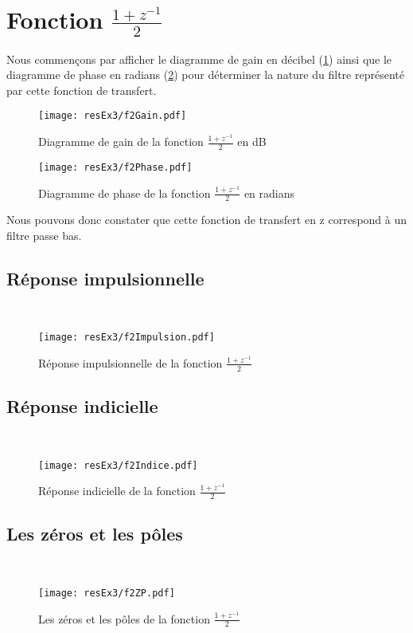 \section{Fonction $\frac{1+z^{-1}}{2}$}
Nous commençons par afficher le diagramme de gain en décibel (\ref{f2 Diagramme de gain}) ainsi que le diagramme de phase en radians (\ref{f2 Diagramme de phase}) pour déterminer la nature du filtre représenté par cette fonction de transfert.
\begin{figure}[H]
\centering
\texttt{[image: resEx3/f2Gain.pdf]}
\caption{Diagramme de gain de la fonction $\frac{1+z^{-1}}{2}$ en dB}
\label{f2 Diagramme de gain}
\end{figure}
\begin{figure}[H]
\centering
\texttt{[image: resEx3/f2Phase.pdf]}
\caption{Diagramme de phase de la fonction $\frac{1+z^{-1}}{2}$ en radians}
\label{f2 Diagramme de phase}
\end{figure}
Nous pouvons donc constater que cette fonction de transfert en z correspond à un filtre passe bas.
\subsection{Réponse impulsionnelle}
~\\
\begin{figure}[H]
\centering
\texttt{[image: resEx3/f2Impulsion.pdf]}
\caption{Réponse impulsionnelle de la fonction $\frac{1+z^{-1}}{2}$ }
\end{figure}

\subsection{Réponse indicielle}
~\\
\begin{figure}[H]
\centering
\texttt{[image: resEx3/f2Indice.pdf]}
\caption{Réponse indicielle de la fonction $\frac{1+z^{-1}}{2}$ }
\end{figure}

\subsection{Les zéros et les pôles}
~\\
\begin{figure}[H]
\centering
\texttt{[image: resEx3/f2ZP.pdf]}
\caption{Les zéros et les pôles de la fonction $\frac{1+z^{-1}}{2}$ }
\end{figure}


